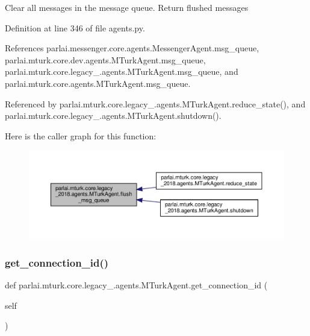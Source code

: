 \begin{DoxyVerb}Clear all messages in the message queue. Return flushed messages\end{DoxyVerb}
 

Definition at line 346 of file agents.\+py.



References parlai.\+messenger.\+core.\+agents.\+Messenger\+Agent.\+msg\+\_\+queue, parlai.\+mturk.\+core.\+dev.\+agents.\+M\+Turk\+Agent.\+msg\+\_\+queue, parlai.\+mturk.\+core.\+legacy\+\_.\+agents.\+M\+Turk\+Agent.\+msg\+\_\+queue, and parlai.\+mturk.\+core.\+agents.\+M\+Turk\+Agent.\+msg\+\_\+queue.



Referenced by parlai.\+mturk.\+core.\+legacy\+\_.\+agents.\+M\+Turk\+Agent.\+reduce\+\_\+state(), and parlai.\+mturk.\+core.\+legacy\+\_.\+agents.\+M\+Turk\+Agent.\+shutdown().

Here is the caller graph for this function\+:
\nopagebreak
\begin{figure}[H]
\begin{center}
\leavevmode
\includegraphics[width=350pt]{classparlai_1_1mturk_1_1core_1_1legacy__2018_1_1agents_1_1MTurkAgent_a209329c54335277c0998a9185cdfc1d7_icgraph}
\end{center}
\end{figure}
\mbox{\label{classparlai_1_1mturk_1_1core_1_1legacy__2018_1_1agents_1_1MTurkAgent_ac8a29e82cef967de9646252059c6658b}} 
\subsubsection{\texorpdfstring{get\+\_\+connection\+\_\+id()}{get\_connection\_id()}}
{\footnotesize\ttfamily def parlai.\+mturk.\+core.\+legacy\+\_.\+agents.\+M\+Turk\+Agent.\+get\+\_\+connection\+\_\+id (\begin{DoxyParamCaption}\item[{}]{self }\end{DoxyParamCaption})}

